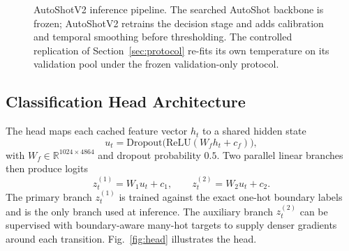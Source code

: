 \begin{figure}[!t]
\centering
{}
\caption{AutoShotV2 inference pipeline. The searched AutoShot backbone is
frozen; AutoShotV2 retrains the decision stage and adds calibration and
temporal smoothing before thresholding. The controlled replication of
Section~\ref{sec:protocol} re-fits its own temperature on its validation
pool under the frozen validation-only protocol.}
\label{fig:pipeline}
\end{figure}

\subsection{Classification Head Architecture}
\label{sec:head}

The head maps each cached feature vector $h_t$ to a shared hidden state
\begin{equation}
    u_t = \mathrm{Dropout}\bigl(\mathrm{ReLU}(W_f h_t + c_f)\bigr),
    \label{eq:hidden}
\end{equation}
with $W_f\in\mathbb{R}^{1024\times4864}$ and dropout probability $0.5$. Two
parallel linear branches then produce logits
\begin{equation}
    z^{(1)}_t = W_1 u_t + c_1, \qquad z^{(2)}_t = W_2 u_t + c_2.
    \label{eq:branches}
\end{equation}
The primary branch $z^{(1)}_t$ is trained against the exact one-hot boundary
labels and is the only branch used at inference. The auxiliary branch
$z^{(2)}_t$ can be supervised with boundary-aware many-hot targets to supply
denser gradients around each transition. Fig.~\ref{fig:head} illustrates
the head.

